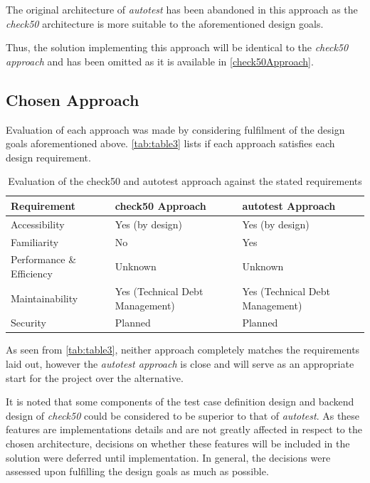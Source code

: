 \documentclass[hidelinks]{report}
\begin{document}
The original architecture of \textit{autotest} has been abandoned in this approach as the \textit{check50} architecture is more suitable to the aforementioned design goals.

Thus, the solution implementing this approach will be identical to the \textit{check50 approach} and has been omitted as it is available in \autoref{check50Approach}.

\subsection{Chosen Approach}

Evaluation of each approach was made by considering fulfilment of the design goals aforementioned above. \autoref{tab:table3} lists if each approach satisfies each design requirement.

\begin{table}[h]
	\centering
	\begin{tabular}{lll}
		\toprule
		\textbf{Requirement} & \textbf{check50 Approach} & \textbf{autotest Approach} \\
		\midrule
		Accessibility    & Yes (by design) & Yes (by design) \\
		Familiarity      & No  & Yes \\
		Performance \& Efficiency & Unknown & Unknown \\
		Maintainability  & Yes (Technical Debt Management) & Yes (Technical Debt Management) \\
		Security 		 & Planned & Planned \\
		\bottomrule
	\end{tabular}
	\caption{Evaluation of the check50 and autotest approach against the stated requirements}
	\label{tab:table3}
\end{table}

As seen from \autoref{tab:table3}, neither approach completely matches the requirements laid out, however the \textit{autotest approach} is close and will serve as an appropriate start for the project over the alternative.

It is noted that some components of the test case definition design and backend design of \textit{check50} could be considered to be superior to that of \textit{autotest}. As these features are implementations details and are not greatly affected in respect to the chosen architecture, decisions on whether these features will be included in the solution were deferred until implementation. In general, the decisions were assessed upon fulfilling the design goals as much as possible.
\end{document}

